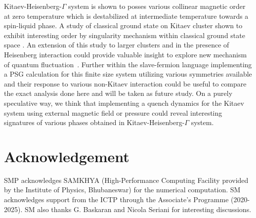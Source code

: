 \documentclass[aps,amsmath,twocolumn,amssymb,floatfix,showpacs,superscriptaddress,nofootinbib,longbibliography]{revtex4-1}
\begin{document}
 Kitaev-Heisenberg-$\Gamma$ system is shown to posses various collinear magnetic order at zero temperature which is destabilized at intermediate temperature towards a spin-liquid phase. A study of classical ground state on Kitaev cluster shown to exhibit interesting order by singularity mechanism within classical ground state space \cite{sarvesh-2020,anjana-2018}. An extension of this study to larger clusters and in the presence of Heisenberg interaction could provide valuable insight to explore new mechanism of quantum fluctuation~\cite{khatua-2021}. Further within the slave-fermion language implementing a PSG calculation\cite{wen-2002,yasir-2020,atanu-2023} for this finite size system utilizing various symmetries available and their response to various non-Kitaev interaction could be useful to compare the exact analysis done here and will be taken as future study. On a purely speculative way, we think that implementing a quench dynamics for the Kitaev system using external magnetic field or pressure could reveal interesting signatures of various phases obtained in Kitaev-Heisenberg-$\Gamma$ system.   


\section*{Acknowledgement} 
SMP acknowledges SAMKHYA (High-Performance Computing Facility provided by the Institute of Physics, Bhubaneswar) for the numerical computation. SM acknowledges support from the ICTP through the Associate's Programme (2020-2025). SM also thanks G. Baskaran and Nicola Seriani for interesting discussions.
\end{document}
